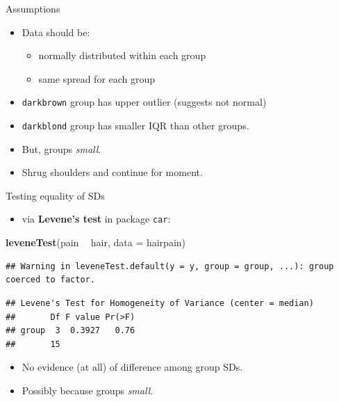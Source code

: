 \documentclass[ignorenonframetext,]{beamer}
\newenvironment{Shaded}{\begin{snugshade}}{\end{snugshade}}
\newcommand{\DataTypeTok}[1]{\textcolor[rgb]{0.13,0.29,0.53}{#1}}
\newcommand{\KeywordTok}[1]{\textcolor[rgb]{0.13,0.29,0.53}{\textbf{#1}}}
\newcommand{\NormalTok}[1]{#1}
\newcommand{\OperatorTok}[1]{\textcolor[rgb]{0.81,0.36,0.00}{\textbf{#1}}}
\newcommand{\StringTok}[1]{\textcolor[rgb]{0.31,0.60,0.02}{#1}}
\providecommand{\tightlist}{%
  \setlength{\itemsep}{0pt}\setlength{\parskip}{0pt}}
\begin{document}
\begin{frame}[fragile]{Assumptions}
\protect\hypertarget{assumptions}{}

\begin{itemize}
\item
  Data should be:

  \begin{itemize}
  \item
    normally distributed within each group
  \item
    same spread for each group
  \end{itemize}
\item
  \texttt{darkbrown} group has upper outlier (suggests not normal)
\item
  \texttt{darkblond} group has smaller IQR than other groups.
\item
  But, groups \emph{small}.
\item
  Shrug shoulders and continue for moment.
\end{itemize}

\end{frame}

\begin{frame}[fragile]{Testing equality of SDs}
\protect\hypertarget{testing-equality-of-sds}{}

\begin{itemize}
\tightlist
\item
  via \textbf{Levene's test} in package \texttt{car}:
\end{itemize}

\small

\begin{Shaded}
\begin{Highlighting}[]
\KeywordTok{leveneTest}\NormalTok{(pain }\OperatorTok{~}\StringTok{ }\NormalTok{hair, }\DataTypeTok{data =}\NormalTok{ hairpain)}
\end{Highlighting}
\end{Shaded}

\begin{verbatim}
## Warning in leveneTest.default(y = y, group = group, ...): group coerced to factor.
\end{verbatim}

\begin{verbatim}
## Levene's Test for Homogeneity of Variance (center = median)
##       Df F value Pr(>F)
## group  3  0.3927   0.76
##       15
\end{verbatim}

\normalsize

\begin{itemize}
\item
  No evidence (at all) of difference among group SDs.
\item
  Possibly because groups \emph{small}.
\end{itemize}

\end{frame}
\end{document}
